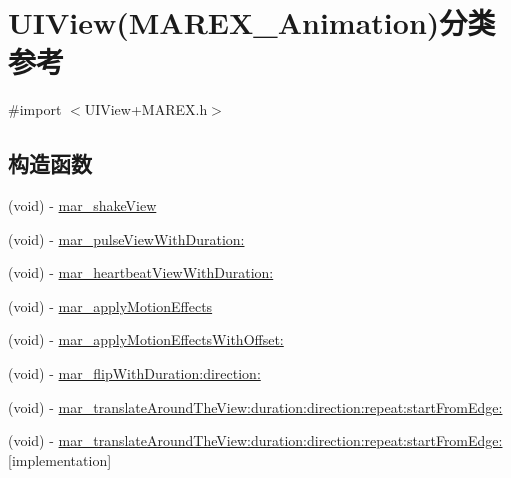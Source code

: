 \hypertarget{category_u_i_view_07_m_a_r_e_x___animation_08}{}\section{U\+I\+View(M\+A\+R\+E\+X\+\_\+\+Animation)分类 参考}
\label{category_u_i_view_07_m_a_r_e_x___animation_08}


{\ttfamily \#import $<$U\+I\+View+\+M\+A\+R\+E\+X.\+h$>$}

\subsection*{构造函数}
\begin{DoxyCompactItemize}
\item 
(void) -\/ \hyperlink{category_u_i_view_07_m_a_r_e_x___animation_08_a562ffaac9e7371bad81d629f5ca1daff}{mar\+\_\+shake\+View}
\item 
(void) -\/ \hyperlink{category_u_i_view_07_m_a_r_e_x___animation_08_a48cc0e4fd10177664209962e11c194eb}{mar\+\_\+pulse\+View\+With\+Duration\+:}
\item 
(void) -\/ \hyperlink{category_u_i_view_07_m_a_r_e_x___animation_08_a35f9de4de9b4bf16aef68b5e8d29dcff}{mar\+\_\+heartbeat\+View\+With\+Duration\+:}
\item 
(void) -\/ \hyperlink{category_u_i_view_07_m_a_r_e_x___animation_08_a9184516bc18938c694741209d94a752c}{mar\+\_\+apply\+Motion\+Effects}
\item 
(void) -\/ \hyperlink{category_u_i_view_07_m_a_r_e_x___animation_08_a22da146499b0b252d88653e7704aac1b}{mar\+\_\+apply\+Motion\+Effects\+With\+Offset\+:}
\item 
(void) -\/ \hyperlink{category_u_i_view_07_m_a_r_e_x___animation_08_ab9e434925a40b614fe14a7594026f14f}{mar\+\_\+flip\+With\+Duration\+:direction\+:}
\item 
(void) -\/ \hyperlink{category_u_i_view_07_m_a_r_e_x___animation_08_a1a3a47e969aee9116a75a8d12eed71c1}{mar\+\_\+translate\+Around\+The\+View\+:duration\+:direction\+:repeat\+:start\+From\+Edge\+:}
\item 
(void) -\/ \hyperlink{category_u_i_view_07_m_a_r_e_x___animation_08_a46570eeaaaf77381d72a6af2f65ac26d}{mar\+\_\+translate\+Around\+The\+View\+:duration\+:direction\+:repeat\+:start\+From\+Edge\+:}{\ttfamily  \mbox{[}implementation\mbox{]}}
\end{DoxyCompactItemize}


